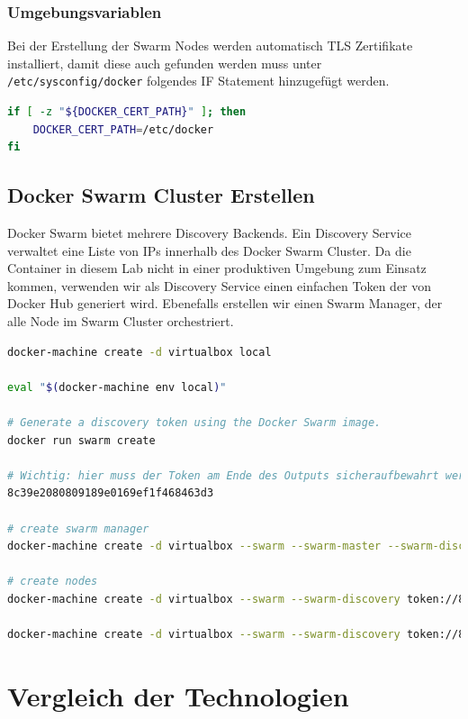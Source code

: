 \subsubsection{Umgebungsvariablen}
Bei der Erstellung der Swarm Nodes werden automatisch TLS Zertifikate installiert, damit diese auch gefunden werden muss unter \lstinline[]|/etc/sysconfig/docker| folgendes IF Statement hinzugefügt werden. 
\begin{lstlisting}[caption=/etc/sysconfig/docker, language=bash]
if [ -z "${DOCKER_CERT_PATH}" ]; then
	DOCKER_CERT_PATH=/etc/docker
fi
\end{lstlisting}

\subsection{Docker Swarm Cluster Erstellen}
Docker Swarm bietet mehrere Discovery Backends. Ein Discovery Service verwaltet eine Liste von IPs innerhalb des Docker Swarm Cluster. Da die Container in diesem Lab nicht in einer produktiven Umgebung zum Einsatz kommen, verwenden wir als Discovery Service einen einfachen Token der von Docker Hub generiert wird. Ebenefalls erstellen wir einen Swarm Manager, der alle Node im Swarm Cluster orchestriert.

\begin{lstlisting}[language=bash]
docker-machine create -d virtualbox local

eval "$(docker-machine env local)"

# Generate a discovery token using the Docker Swarm image.
docker run swarm create

# Wichtig: hier muss der Token am Ende des Outputs sicheraufbewahrt werden: 
8c39e2080809189e0169ef1f468463d3

# create swarm manager
docker-machine create -d virtualbox --swarm --swarm-master --swarm-discovery token://8c39e2080809189e0169ef1f468463d3 swarm-master

# create nodes
docker-machine create -d virtualbox --swarm --swarm-discovery token://8c39e2080809189e0169ef1f468463d3 node01

docker-machine create -d virtualbox --swarm --swarm-discovery token://8c39e2080809189e0169ef1f468463d3 node01
\end{lstlisting}

\section{Vergleich der Technologien}

